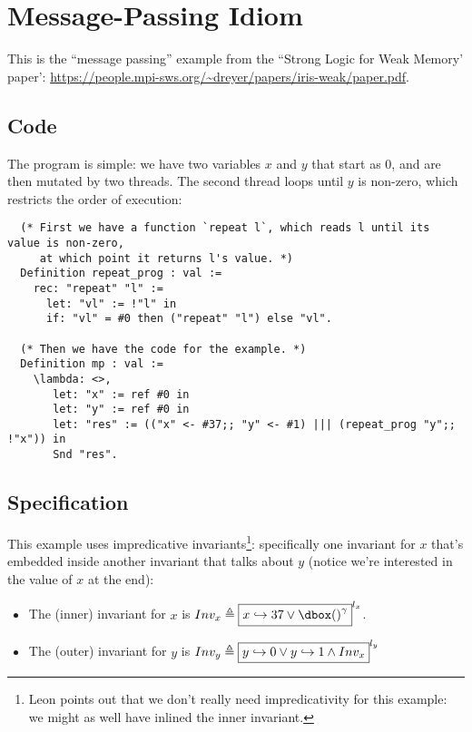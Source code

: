 \section{Message-Passing Idiom}
\label{message-passing-idiom}


This is the ``message passing'' example from the ``Strong Logic for Weak Memory' paper': \url{https://people.mpi-sws.org/~dreyer/papers/iris-weak/paper.pdf}.


\subsection{Code}

The program is simple: we have two variables $x$ and $y$ that start as $0$, and are then mutated by two threads. The second thread loops until $y$ is non-zero, which restricts the order of execution:

\begin{verbatim}
  (* First we have a function `repeat l`, which reads l until its value is non-zero,
     at which point it returns l's value. *)
  Definition repeat_prog : val :=
    rec: "repeat" "l" :=
      let: "vl" := !"l" in
      if: "vl" = #0 then ("repeat" "l") else "vl".

  (* Then we have the code for the example. *)
  Definition mp : val :=
    \lambda: <>,
       let: "x" := ref #0 in
       let: "y" := ref #0 in
       let: "res" := (("x" <- #37;; "y" <- #1) ||| (repeat_prog "y";; !"x")) in
       Snd "res".
\end{verbatim}

\subsection{Specification}

This example uses impredicative invariants\footnote{Leon points out that we don't really need impredicativity for this example: we might as well have inlined  the inner invariant.}: specifically one invariant for $x$ that's embedded inside another invariant that talks about $y$ (notice we're interested in the value of $x$ at the end):
\begin{itemize}
\item The (inner) invariant for $x$ is $Inv_x \triangleq \inv{$\pointsto{x}{37} \lor \ownr{()}{\gamma}$}{l_x}$.

\item The (outer) invariant for $y$ is $Inv_y \triangleq \fbox{$y \hookrightarrow 0 \lor y \hookrightarrow 1 \land  Inv_x$}^{l_y}$
\end{itemize}

